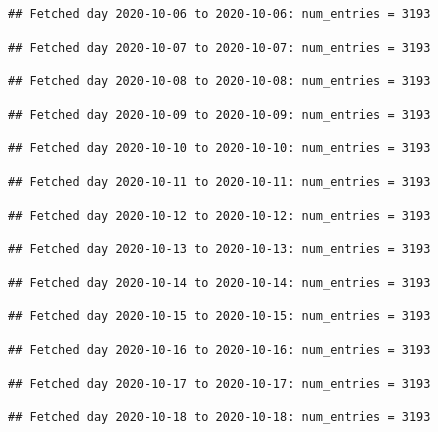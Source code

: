 \documentclass[]{article}
\begin{document}
\begin{verbatim}
## Fetched day 2020-10-06 to 2020-10-06: num_entries = 3193
\end{verbatim}

\begin{verbatim}
## Fetched day 2020-10-07 to 2020-10-07: num_entries = 3193
\end{verbatim}

\begin{verbatim}
## Fetched day 2020-10-08 to 2020-10-08: num_entries = 3193
\end{verbatim}

\begin{verbatim}
## Fetched day 2020-10-09 to 2020-10-09: num_entries = 3193
\end{verbatim}

\begin{verbatim}
## Fetched day 2020-10-10 to 2020-10-10: num_entries = 3193
\end{verbatim}

\begin{verbatim}
## Fetched day 2020-10-11 to 2020-10-11: num_entries = 3193
\end{verbatim}

\begin{verbatim}
## Fetched day 2020-10-12 to 2020-10-12: num_entries = 3193
\end{verbatim}

\begin{verbatim}
## Fetched day 2020-10-13 to 2020-10-13: num_entries = 3193
\end{verbatim}

\begin{verbatim}
## Fetched day 2020-10-14 to 2020-10-14: num_entries = 3193
\end{verbatim}

\begin{verbatim}
## Fetched day 2020-10-15 to 2020-10-15: num_entries = 3193
\end{verbatim}

\begin{verbatim}
## Fetched day 2020-10-16 to 2020-10-16: num_entries = 3193
\end{verbatim}

\begin{verbatim}
## Fetched day 2020-10-17 to 2020-10-17: num_entries = 3193
\end{verbatim}

\begin{verbatim}
## Fetched day 2020-10-18 to 2020-10-18: num_entries = 3193
\end{verbatim}
\end{document}
